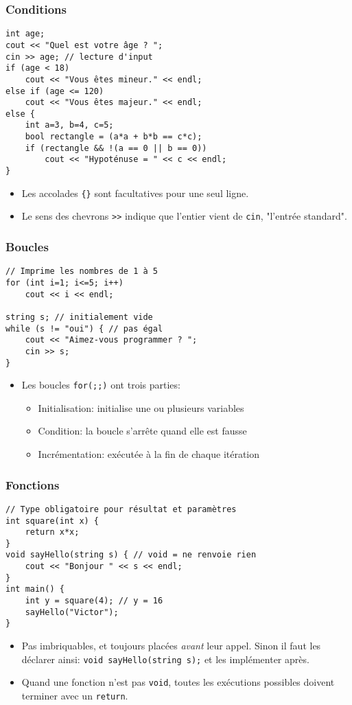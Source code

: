 \documentclass[12pt]{beamer}
\begin{document}
\begin{frame}[fragile]
\frametitle{Conditions}
\begin{lstlisting}
int age;
cout << "Quel est votre âge ? ";
cin >> age; // lecture d'input
if (age < 18)
    cout << "Vous êtes mineur." << endl;
else if (age <= 120)
    cout << "Vous êtes majeur." << endl;
else {
    int a=3, b=4, c=5;
    bool rectangle = (a*a + b*b == c*c);
    if (rectangle && !(a == 0 || b == 0))
        cout << "Hypoténuse = " << c << endl;
}
\end{lstlisting}
\begin{itemize}
\item Les accolades \lstinline|{}| sont facultatives pour une seul ligne.
\item Le sens des chevrons \lstinline|>>| indique que l'entier vient de \lstinline|cin|, "l'entrée standard".
\end{itemize}
\end{frame}

\begin{frame}[fragile]
\frametitle{Boucles}
\begin{lstlisting}
// Imprime les nombres de 1 à 5
for (int i=1; i<=5; i++)
    cout << i << endl;

string s; // initialement vide
while (s != "oui") { // pas égal
    cout << "Aimez-vous programmer ? ";
    cin >> s;
}
\end{lstlisting}
\begin{itemize}
\item Les boucles \lstinline|for(;;)| ont trois parties:
\begin{itemize}
\item Initialisation: initialise une ou plusieurs variables
\item Condition: la boucle s'arrête quand elle est fausse
\item Incrémentation: exécutée à la fin de chaque itération
\end{itemize}
\end{itemize}
\end{frame}

\begin{frame}[fragile]
\frametitle{Fonctions}
\begin{lstlisting}
// Type obligatoire pour résultat et paramètres
int square(int x) {
    return x*x;
}
void sayHello(string s) { // void = ne renvoie rien
    cout << "Bonjour " << s << endl;
}
int main() {
    int y = square(4); // y = 16
    sayHello("Victor");
}
\end{lstlisting}
\begin{itemize}
\item Pas imbriquables, et toujours placées \emph{avant} leur appel. Sinon il faut les déclarer ainsi: \lstinline|void sayHello(string s);| et les implémenter après.
\item Quand une fonction n'est pas \lstinline|void|, toutes les exécutions possibles doivent terminer avec un \lstinline|return|.
\end{itemize}
\end{frame}
\end{document}
